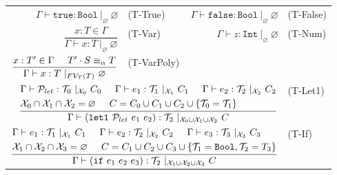\documentclass{article}
\begin{document}
\begin{figure}[tb]
    \centering
    \begin{tabular}{rlrl}
        $\Gamma \vdash \mathtt{true} : \mathtt{Bool}\ |_\varnothing\ \varnothing$ & (T-True) &
        $\Gamma \vdash \mathtt{false} : \mathtt{Bool}\ |_\varnothing\ \varnothing$ & (T-False) \vspace{5mm} \\

        $\dfrac{x : T \in \Gamma}{\Gamma \vdash x : T\ |_\varnothing\ \varnothing}$ & (T-Var) &
        $\Gamma \vdash z : \mathtt{Int}\ |_\varnothing\ \varnothing$ & (T-Num) \vspace{5mm} \\

        $\dfrac{x : T' \in \Gamma \hspace{5mm} T' \cdot S \equiv_\alpha T}{\Gamma \vdash x : T\ |_{FV_\mathcal{T}(T)}\ \varnothing}$ & (T-VarPoly) \vspace{5mm} \\

        \multicolumn{3}{r}{
        $\dfrac{
            \begin{aligned}
                &\Gamma \vdash \mathcal{P}_{let} : \mathcal{T}_0\ |_{\mathcal{X}_0}\ C_0 \hspace{5mm}
                    \Gamma \vdash e_1 : \mathcal{T}_1\ |_{\mathcal{X}_1}\ C_1 \hspace{5mm}
                    \Gamma \vdash e_2 : \mathcal{T}_2\ |_{\mathcal{X}_2}\ C_2\\
                &\mathcal{X}_0 \cap \mathcal{X}_1 \cap \mathcal{X}_2 = \varnothing \hspace{5mm}
                    C = C_0 \cup C_1 \cup C_2 \cup \{ \mathcal{T}_0 = \mathcal{T}_1 \}
            \end{aligned}
        }{
            \Gamma \vdash (\mathtt{let1}\ \mathcal{P}_{let}\ e_1\ e_2) : \mathcal{T}_2\ |_{\mathcal{X}_0 \cup \mathcal{X}_1 \cup \mathcal{X}_2}\ C
        }$} & (T-Let1) \vspace{5mm} \\

        \multicolumn{3}{r}{
        $\dfrac{
            \begin{aligned}
                &\Gamma \vdash e_1 : \mathcal{T}_1\ |_{\mathcal{X}_1}\ C_1 \hspace{5mm} \Gamma \vdash e_2 : \mathcal{T}_2\ |_{\mathcal{X}_2}\ C_2 \hspace{5mm} \Gamma \vdash e_3 : \mathcal{T}_3\ |_{\mathcal{X}_3}\ C_3 \\
                &\mathcal{X}_1 \cap \mathcal{X}_2 \cap \mathcal{X}_3 = \varnothing \hspace{5mm} C = C_1 \cup C_2 \cup C_3 \cup \{ \mathcal{T}_1 = \mathtt{Bool}, \mathcal{T}_2 = T_3 \}
            \end{aligned}
        }{
            \Gamma \vdash (\mathtt{if}\ e_1\ e_2\ e_3) : \mathcal{T}_2\ |_{\mathcal{X}_1 \cup \mathcal{X}_2 \cup \mathcal{X}_3}\ C
        }$} & (T-If) \vspace{5mm} \\


\end{tabular}
\end{figure}
\end{document}
